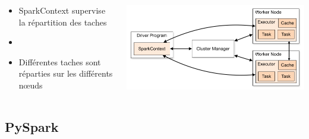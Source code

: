 \documentclass[8pt,aspectratio=169,hyperref={unicode=true}]{beamer}
\begin{document}
\begin{frame}{\insertsubsection}
  \begin{columns}
    \begin{column}{.5\textwidth}
      \begin{itemize}
        \item SparkContext supervise la répartition des taches
        \item[]
        \item Différentes taches sont réparties sur les différents nœuds
      \end{itemize}
    \end{column}
    \begin{column}{.5\textwidth}
      \includegraphics[width=\textwidth]{./cluster-overview.png}
    \end{column}
  \end{columns}
\end{frame}

\subsection{PySpark}
\end{document}
